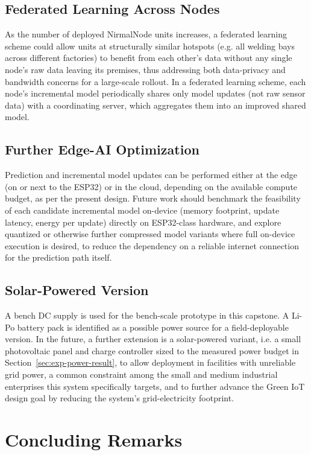 \subsection{Federated Learning Across Nodes}
\label{sec:future-federated}
As the number of deployed NirmalNode units increases, a federated learning scheme could allow units at structurally similar hotspots (e.g. all welding bays across different factories) to benefit from each other’s data without any single node’s raw data leaving its premises, thus addressing both data-privacy and bandwidth concerns for a large-scale rollout. In a federated learning scheme, each node’s incremental model periodically shares only model updates (not raw sensor data) with a coordinating server, which aggregates them into an improved shared model.

\subsection{Further Edge-AI Optimization}
\label{sec:future-edge-ai}
Prediction and incremental model updates can be performed either at the edge (on or next to the ESP32) or in the cloud, depending on the available compute budget, as per the present design. Future work should benchmark the feasibility of each candidate incremental model on-device (memory footprint, update latency, energy per update) directly on ESP32-class hardware, and explore quantized or otherwise further compressed model variants where full on-device execution is desired, to reduce the dependency on a reliable internet connection for the prediction path itself.

\subsection{Solar-Powered Version}
\label{sec:future-solar}
A bench DC supply is used for the bench-scale prototype in this capstone. A Li-Po battery pack is identified as a possible power source for a field-deployable version. In the future, a further extension is a solar-powered variant, i.e. a small photovoltaic panel and charge controller sized to the measured power budget in Section~\ref{sec:exp-power-result}, to allow deployment in facilities with unreliable grid power, a common constraint among the small and medium industrial enterprises this system specifically targets, and to further advance the Green IoT design goal by reducing the system's grid-electricity footprint.

\section{Concluding Remarks}
\label{sec:conc-remarks}

